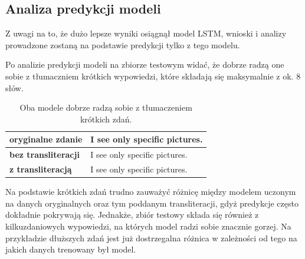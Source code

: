\documentclass[
    left=2.5cm,         %
    right=2.5cm,        %
    top=2.5cm,          %
    bottom=3cm,         %
    bindingoffset=6mm,  %
    nohyphenation=false %
]{eiti/eiti-report}
\begin{document}
\subsection{Analiza predykcji modeli}
Z uwagi na to, że dużo lepsze wyniki osiągnął model LSTM, wnioski i analizy prowadzone zostaną na podstawie predykcji tylko z tego modelu.

Po analizie predykcji modeli na zbiorze testowym widać, że dobrze radzą one sobie z tłumaczniem krótkich wypowiedzi, które składają się maksymalnie z ok. 8 słów.

\begin{table}[H]
\centering
\footnotesize
\begin{tabular}{ |p{4cm}|p{10cm}|  }
    \hline
    \textbf{oryginalne zdanie} & I see only specific pictures.\\
     \hline
     \textbf{bez transliteracji} & I see only specific pictures. \\
     \hline
     \textbf{z transliteracją} & I see only specific pictures. \\
     \hline
\end{tabular}
\caption{Oba modele dobrze radzą sobie z tłumaczeniem krótkich zdań.}
\label{tab:attr_table}
\end{table}

Na podstawie krótkich zdań trudno zauważyć różnicę między modelem uczonym na danych oryginalnych oraz tym poddanym transliteracji, gdyż predykcje często dokładnie pokrywają się.
Jednakże, zbiór testowy składa się również z kilkuzdaniowych wypowiedzi, na których model radzi sobie znacznie gorzej. Na przykładzie dłuższych zdań jest już dostrzegalna różnica w zależności od tego na jakich danych trenowany był model.
\end{document}
